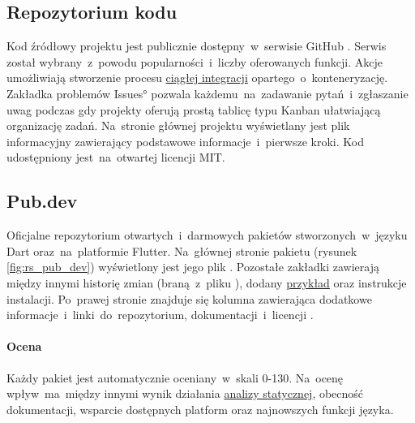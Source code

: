 \subsection{Repozytorium kodu}
Kod źródłowy projektu jest publicznie dostępny~w~serwisie GitHub \cite{RoundSpot_GitHub}. Serwis został wybrany~z~powodu popularności~i~liczby oferowanych funkcji. Akcje umożliwiają stworzenie procesu \hyperref[sec:rs_ci]{ciągłej integracji} opartego~o~konteneryzację. Zakładka problemów \ang{Issues} pozwala każdemu~na~zadawanie pytań~i~zgłaszanie uwag podczas gdy projekty oferują prostą tablicę typu Kanban ułatwiającą organizację zadań. Na~stronie głównej projektu wyświetlany jest plik informacyjny  zawierający podstawowe informacje~i~pierwsze kroki. Kod udostępniony jest~na~otwartej licencji MIT.

\subsection{Pub.dev}
Oficjalne repozytorium otwartych~i~darmowych pakietów stworzonych~w~języku Dart oraz~na~platformie Flutter. Na~głównej stronie pakietu (rysunek \ref{fig:rs_pub_dev}) wyświetlony jest jego plik . Pozostałe zakładki zawierają między innymi historię zmian (braną~z~pliku ), dodany \hyperref[sec:rs_example]{przykład} oraz instrukcje instalacji. Po~prawej stronie znajduje się kolumna zawierająca dodatkowe informacje~i~linki~do~repozytorium, dokumentacji~i~licencji \cite{RS_Pub_dev}.

\paragraph{Ocena} Każdy pakiet jest automatycznie oceniany~w~skali 0-130. Na~ocenę wpływ~ma~między innymi wynik działania \hyperref[par:static_analysis]{analizy statycznej}, obecność dokumentacji, wsparcie dostępnych platform oraz najnowszych funkcji języka.

\bigskip
{}

